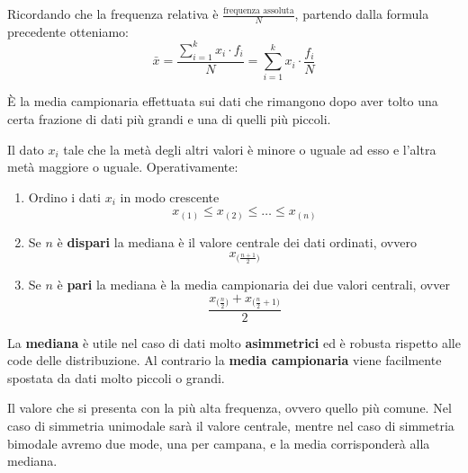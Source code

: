 \begin{definition}
	Ricordando che la frequenza relativa è $\frac{\text{frequenza assoluta}}{N}$, partendo dalla formula precedente otteniamo:
	\begin{equation}
		\bar{x} = \frac{\sum_{i=1}^{k}x_i \cdot f_i}{N} = \sum_{i=1}^{k} x_i \cdot \frac{f_i}{N}
	\end{equation}
\end{definition}

\begin{definition}
	È la media campionaria effettuata sui dati che rimangono dopo aver tolto una certa frazione di dati più grandi e una di quelli più piccoli.
\end{definition}

\begin{definition}[Mediana]
	Il dato $x_i$ tale che la metà degli altri valori è minore o uguale ad esso e l'altra metà maggiore o uguale. Operativamente:
	\begin{enumerate}
		\item  Ordino i dati $x_i$ in modo crescente
		\begin{equation*}
			x_{(1)} \leq x_{(2)} \leq \ldots \leq x_{(n)}
		\end{equation*}
		\item Se $n$ è \textbf{dispari} la mediana è il valore centrale dei dati ordinati, ovvero
		\begin{equation*}
			x_{\big(\frac{n+1}{2}\big)}
		\end{equation*}
		\item Se $n$ è \textbf{pari} la mediana è la media campionaria dei due valori centrali, ovver
		\begin{equation*}
			\frac{x_{\big(\frac{n}{2}\big)} + x_{\big(\frac{n}{2}+1\big)}}{2}
		\end{equation*}
	\end{enumerate}
\end{definition}

\begin{observation}
	La \textbf{mediana} è utile nel caso di dati molto \textbf{asimmetrici} ed è robusta rispetto alle code delle distribuzione. Al contrario la \textbf{media campionaria} viene facilmente spostata da dati molto piccoli o grandi.
\end{observation}

\begin{definition}[Moda]
	Il valore che si presenta con la più alta frequenza, ovvero quello più comune. Nel caso di simmetria unimodale sarà il valore centrale, mentre nel caso di simmetria bimodale avremo due mode, una per campana, e la media corrisponderà alla mediana.
\end{definition}

